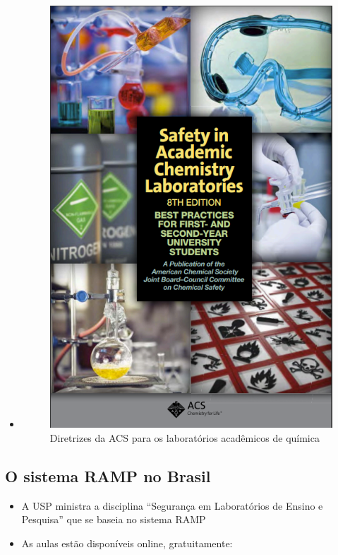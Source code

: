 \documentclass[
  letterpaper,
  DIV=11,
  numbers=noendperiod]{scrartcl}
\providecommand{\tightlist}{%
  \setlength{\itemsep}{0pt}\setlength{\parskip}{0pt}}\usepackage{longtable,booktabs,array}
\begin{document}
\begin{itemize}
\item
  \begin{figure}[H]

  {\centering \includegraphics[width=4.375in,height=\textheight,keepaspectratio]{imagens/sacl8.png}

  }

  \caption{Diretrizes da ACS para os laboratórios acadêmicos de química}

  \end{figure}%
\end{itemize}

\subsection{O sistema RAMP no Brasil}\label{o-sistema-ramp-no-brasil}

\begin{itemize}
\tightlist
\item
  A USP ministra a disciplina ``Segurança em Laboratórios de Ensino e
  Pesquisa'' que se baseia no sistema RAMP
\item
  As aulas estão disponíveis online, gratuitamente:
\end{itemize}
\end{document}
